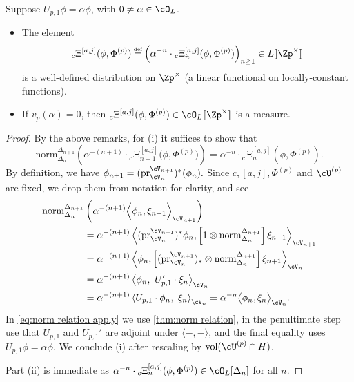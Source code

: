 \documentclass[10pt,reqno,a4paper]{amsart}
\begin{document}
\begin{corollary}
Suppose  $U_{p,1}\phi = \alpha\phi$, with $0 \neq \alpha \in \cO_L$.
	\begin{itemize}
		\item[(i)]
The element
\[
{}_c\Xi^{[a,j]}(\phi, \Phi^{(p)}) \defeq \left(\alpha^{-n} \cdot {}_c\Xi_n^{[a,j]}(\phi, \Phi^{(p)})\right)_{n \ge 1} \in L[\![ \Zp^\times]\!]
\]
is a well-defined distribution on $\Zp^\times$ (a linear functional on locally-constant functions). 

\item[(ii)]If $v_p(\alpha)=0$, then ${}_c\Xi^{[a,j]}(\phi, \Phi^{(p)}) \in \cO_L[\![\Zp^\times]\!]$ is a measure.
\end{itemize}
\end{corollary}
\begin{proof}
By the above remarks, for (i) it suffices to show that
\begin{equation}\label{eq:measure relation}
	\mathrm{norm}^{\Delta_{n+1}}_{\Delta_n}\left( \alpha^{-(n+1)}\cdot 	{}_c\Xi_{n+1}^{[a,j]}\big(\phi, \Phi^{(p)}\big)\right) = \alpha^{-n} \cdot 	{}_c\Xi_n^{[a,j]}\left(\phi, \Phi^{(p)}\right).
\end{equation}
By definition, we have $\phi_{n+1} = (\mathrm{pr}_{\cV_n}^{\cV_{n+1}})^*(\phi_n).$ Since $c, [a,j], \Phi^{(p)}$ and $\cU^{(p)}$ are fixed, we drop them from notation for clarity, and see
\begin{align}
	\mathrm{norm}^{\Delta_{n+1}}_{\Delta_n}&\left(\alpha^{-(n+1)} \Big\langle \phi_n, \xi_{n+1} \Big\rangle_{\cV_{n+1}} \right) \notag\\
	& = \alpha^{-(n+1)}\left\langle (\mathrm{pr}_{\cV_n}^{\cV_{n+1}})^*\phi_n, \left[1 \otimes \mathrm{norm}^{\Delta_{n+1}}_{\Delta_n}\right]\xi_{n+1} \right\rangle_{\cV_{n+1}} \notag\\
	& = \alpha^{-(n+1)}\left\langle \phi_n, \left[ (\mathrm{pr}_{\cV_n}^{\cV_{n+1}})_* \otimes \mathrm{norm}^{\Delta_{n+1}}_{\Delta_n}\right]\xi_{n+1} \right\rangle_{\cV_n} \notag\\
	&= \alpha^{-(n+1)}\left\langle \phi_n,\  U_{p,1}'\cdot \xi_{n} \right\rangle_{\cV_n}\label{eq:norm relation apply}\\
	&=\alpha^{-(n+1)}\left\langle U_{p,1}\cdot\phi_n, \  \xi_{n} \right\rangle_{\cV_n} = \alpha^{-n}\big\langle \phi_n, \xi_{n} \big\rangle_{\cV_n}. \notag
\end{align}
In \eqref{eq:norm relation apply} we use \cref{thm:norm relation}, in the penultimate step use that $U_{p,1}$ and $U_{p,1}'$ are adjoint under $\langle-,-\rangle$, and the final equality uses $U_{p,1}\phi= \alpha\phi$. We conclude (i) after rescaling by $\operatorname{vol}(\cU^{(p)} \cap H)$.

Part (ii) is immediate as $\alpha^{-n}\cdot {}_c\Xi_n^{[a,j]}(\phi,\Phi^{(p)}) \in \cO_L[\Delta_n]$ for all $n$. 
\end{proof}
\end{document}
